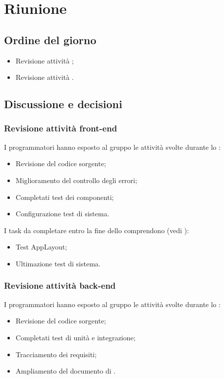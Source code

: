 \section{Riunione}
\subsection{Ordine del giorno}
\begin{itemize}
	\item Revisione attività ;
	\item Revisione attività .
\end{itemize}

\subsection{Discussione e decisioni}
\subsubsection{Revisione attività front-end}
\par I programmatori  hanno esposto al gruppo le attività svolte durante lo :
\begin{itemize}
	\item Revisione del codice sorgente;
	\item Miglioramento del controllo degli errori;
	\item Completati test dei componenti;
	\item Configurazione test di sistema.
\end{itemize}

\vspace{0.5\baselineskip}
\par I task da completare entro la fine dello  comprendono (vedi ):
\begin{itemize}
	\item Test  AppLayout;
	\item Ultimazione test di sistema.
\end{itemize}

\subsubsection{Revisione attività back-end}
\par I programmatori  hanno esposto al gruppo le attività svolte durante lo :
\begin{itemize}
	\item Revisione del codice sorgente;
	\item Completati test di unità e integrazione;
	\item Tracciamento dei requisiti;
	\item Ampliamento del documento di \ST.
\end{itemize}

